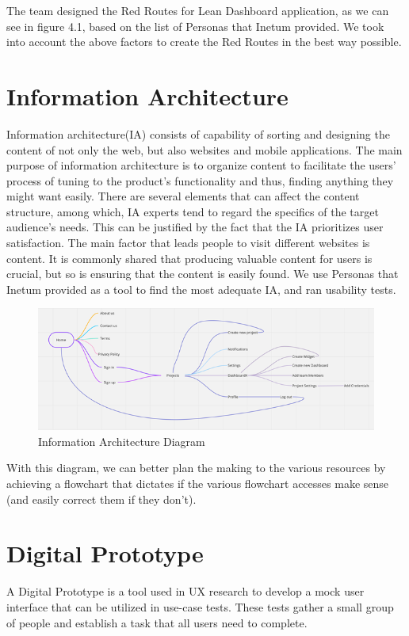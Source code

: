\documentclass[a4paper,twoside,10pt]{report}
\begin{document}
The team designed the Red Routes for Lean Dashboard application, as we can see in figure 4.1, based on the list of Personas that Inetum provided. We took into account the above factors to create the Red Routes in the best way possible.
\newpage

\section{Information Architecture}
Information architecture(IA) consists of capability of sorting and designing the content of not only the web, but also websites and mobile applications. 
The main purpose of information architecture is to organize content to facilitate the users' process of tuning to the product's functionality and thus, finding anything they might want easily.
There are several elements that can affect the content structure, among which, IA experts tend to regard the specifics of the target audience's needs. This can be justified by the fact that the IA prioritizes user satisfaction.
The main factor that leads people to visit different websites is content. It is commonly shared that producing valuable content for users is crucial, but so is ensuring that the content is easily found. We use Personas that Inetum provided as a tool to find the most adequate IA, and ran usability tests.
 
\begin{figure}[h!]
\center
    \includegraphics[width=\textwidth]{information-architecture.png}
\caption{Information Architecture Diagram}
\end{figure}

With this diagram, we can better plan the making to the various resources by achieving a flowchart that dictates if the various flowchart accesses make sense (and easily correct them if they don't).

\newpage
\section{Digital Prototype}
A Digital Prototype is a tool used in UX research to develop a mock user interface that can be utilized in use-case tests. These tests gather a small group of people and establish a task that all users need to complete. 
 
\end{document}
